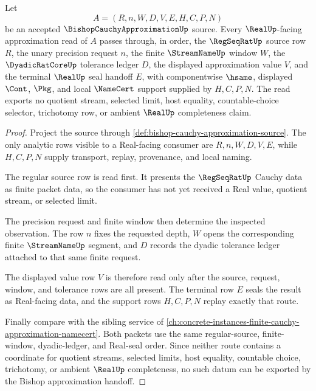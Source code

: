 \begin{theorem}
\label{thm:bishop-cauchy-approximation-window-handoff}
Let
$$
A=(R,n,W,D,V,E,H,C,P,N)
$$
be an accepted $\BishopCauchyApproximationUp$ source. Every $\RealUp$-facing approximation read of $A$ passes through, in order, the $\RegSeqRatUp$ source row $R$, the unary precision request $n$, the finite $\StreamNameUp$ window $W$, the $\DyadicRatCoreUp$ tolerance ledger $D$, the displayed approximation value $V$, and the terminal $\RealUp$ seal handoff $E$, with componentwise $\hsame$, displayed $\Cont$, $\Pkg$, and local $\NameCert$ support supplied by $H,C,P,N$. The read exports no quotient stream, selected limit, host equality, countable-choice selector, trichotomy row, or ambient $\RealUp$ completeness claim.
\end{theorem}
\begin{proof}
Project the source through \autoref{def:bishop-cauchy-approximation-source}. The only analytic rows visible to a Real-facing consumer are $R,n,W,D,V,E$, while $H,C,P,N$ supply transport, replay, provenance, and local naming.

The regular source row is read first. It presents the $\RegSeqRatUp$ Cauchy data as finite packet data, so the consumer has not yet received a Real value, quotient stream, or selected limit.

The precision request and finite window then determine the inspected observation. The row $n$ fixes the requested depth, $W$ opens the corresponding finite $\StreamNameUp$ segment, and $D$ records the dyadic tolerance ledger attached to that same finite request.

The displayed value row $V$ is therefore read only after the source, request, window, and tolerance rows are all present. The terminal row $E$ seals the result as Real-facing data, and the support rows $H,C,P,N$ replay exactly that route.

Finally compare with the sibling service of \autoref{ch:concrete-instances-finite-cauchy-approximation-namecert}. Both packets use the same regular-source, finite-window, dyadic-ledger, and Real-seal order. Since neither route contains a coordinate for quotient streams, selected limits, host equality, countable choice, trichotomy, or ambient $\RealUp$ completeness, no such datum can be exported by the Bishop approximation handoff.
\end{proof}

